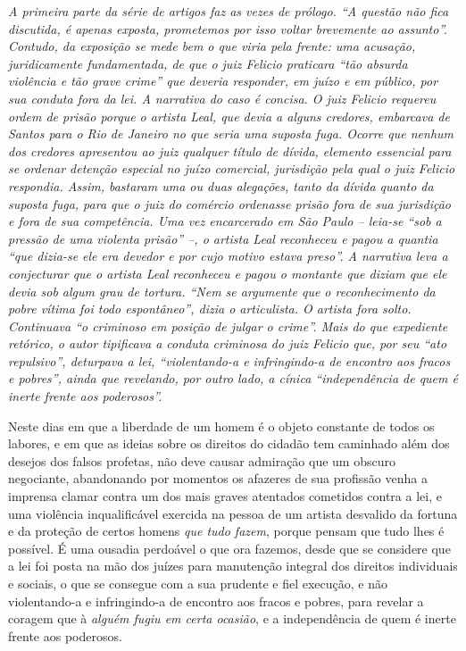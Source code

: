 \begin{didascalia}
\emph{A primeira parte da série de artigos faz as vezes de prólogo. ``A
questão não fica discutida, é apenas exposta, prometemos por isso voltar
brevemente ao assunto''. Contudo, da exposição se mede bem o que viria
pela frente: uma acusação, juridicamente fundamentada, de que o juiz
Felicio praticara ``tão absurda violência e tão grave crime'' que deveria
responder, em juízo e em público, por sua conduta fora da lei. A
narrativa do caso é concisa. O juiz Felicio requereu ordem de prisão
porque o artista Leal, que devia a alguns credores, embarcava de Santos
para o Rio de Janeiro no que seria uma suposta fuga. Ocorre que nenhum
dos credores apresentou ao juiz qualquer título de dívida, elemento
essencial para se ordenar detenção especial no juízo comercial,
jurisdição pela qual o juiz Felicio respondia. Assim, bastaram uma ou
duas alegações, tanto da dívida quanto da suposta fuga, para que o juiz
do comércio ordenasse prisão fora de sua jurisdição e fora de sua
competência. Uma vez encarcerado em São Paulo -- leia-se ``sob a pressão
de uma violenta prisão'' --, o artista Leal reconheceu e pagou a quantia
``que dizia-se ele era devedor e por cujo motivo estava preso''. A
narrativa leva a conjecturar que o artista Leal reconheceu e pagou o
montante que diziam que ele devia sob algum grau de tortura. ``Nem se
argumente que o reconhecimento da pobre vítima foi todo espontâneo'',
dizia o articulista. O artista fora solto. Continuava ``o criminoso em
posição de julgar o crime''. Mais do que expediente retórico, o autor
tipificava a conduta criminosa do juiz Felicio que, por seu ``ato
repulsivo'', deturpava a lei, ``violentando-a e infringindo-a de encontro
aos fracos e pobres'', ainda que revelando, por outro lado, a cínica
``independência de quem é inerte frente aos poderosos''.}
\end{didascalia}

\asterisc{}

Neste dias em que a liberdade de um homem é o objeto constante de todos
os labores, e em que as ideias sobre os direitos do cidadão tem
caminhado além dos desejos dos falsos profetas, não deve causar
admiração que um obscuro negociante, abandonando por momentos os
afazeres de sua profissão venha a imprensa clamar contra um dos mais
graves atentados cometidos contra a lei, e uma violência inqualificável
exercida na pessoa de um artista desvalido da fortuna e da proteção de
certos homens \emph{que tudo fazem}, porque pensam que tudo lhes é
possível. É uma ousadia perdoável o que ora fazemos, desde que se
considere que a lei foi posta na mão dos juízes para manutenção integral
dos direitos individuais e sociais, o que se consegue com a sua prudente
e fiel execução, e não violentando-a e infringindo-a de encontro aos
fracos e pobres, para revelar a coragem que à \emph{alguém fugiu em
certa ocasião}, e a independência de quem é inerte frente aos poderosos.

